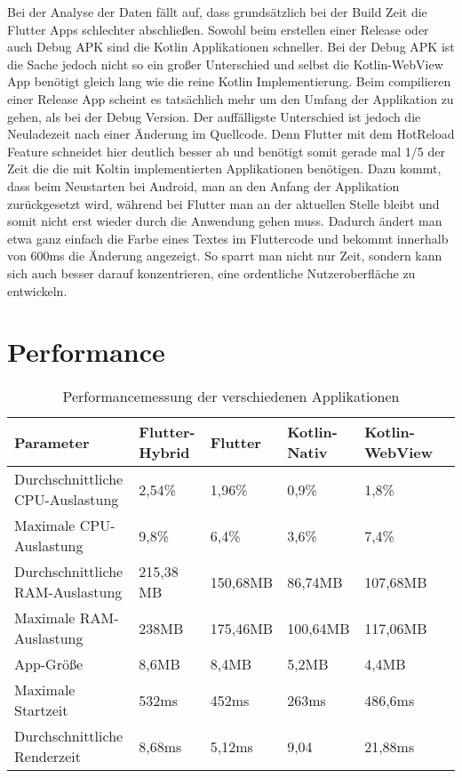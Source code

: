 Bei der Analyse der Daten fällt auf, dass grundsätzlich bei der Build Zeit die Flutter Apps schlechter abschließen. Sowohl beim erstellen einer Release oder auch Debug APK sind die Kotlin Applikationen schneller. Bei der Debug APK ist die Sache jedoch nicht so ein großer Unterschied und selbst die Kotlin-WebView App benötigt gleich lang wie die reine Kotlin Implementierung. Beim compilieren einer Release App scheint es tatsächlich mehr um den Umfang der Applikation zu gehen, als bei der Debug Version.
Der auffälligste Unterschied ist jedoch die Neuladezeit nach einer Änderung im Quellcode. Denn Flutter mit dem HotReload Feature schneidet hier deutlich besser ab und benötigt somit gerade mal 1/5 der Zeit die die mit Koltin implementierten Applikationen benötigen. Dazu kommt, dass beim Neustarten bei Android, man an den Anfang der Applikation zurückgesetzt wird, während bei Flutter man an der aktuellen Stelle bleibt und somit nicht erst wieder durch die Anwendung gehen muss. Dadurch ändert man etwa ganz einfach die Farbe eines Textes im Fluttercode und bekommt innerhalb von 600ms die Änderung angezeigt. So sparrt man nicht nur Zeit, sondern kann sich auch besser darauf konzentrieren, eine ordentliche Nutzeroberfläche zu entwickeln.



\section{Performance}


\begin{table}
\centering
\caption{Performancemessung der verschiedenen Applikationen }
\begin{tabular}{ |p{4cm}||p{3cm}|p{2cm}|p{2cm}|p{2cm}|p{2cm}| }
 \hline
 Parameter & Flutter-Hybrid & Flutter & Kotlin-Nativ & Kotlin-WebView \\
 \hline
 Durchschnittliche CPU-Auslastung       &   2,54\%&   1,96\%& 0,9\%& 1,8\%\\
  \hline
 Maximale CPU- Auslastung  & 9,8\%& 6,4\%& 3,6\%& 7,4\%\\
  \hline
 Durchschnittliche RAM-Auslastung & 215,38 MB& 150,68MB& 86,74MB& 107,68MB\\
  \hline
 Maximale RAM- Auslastung & 238MB& 175,46MB& 100,64MB& 117,06MB\\
  \hline
 App-Größe & 8,6MB& 8,4MB& 5,2MB& 4,4MB\\
  \hline
 Maximale Startzeit & 532ms& 452ms& 263ms& 486,6ms\\
 \hline
 Durchschnittliche Renderzeit &8,68ms& 5,12ms& 9,04& 21,88ms\\
 \hline
\end{tabular}
\label{tab:evaluations_performance}
\end{table}

